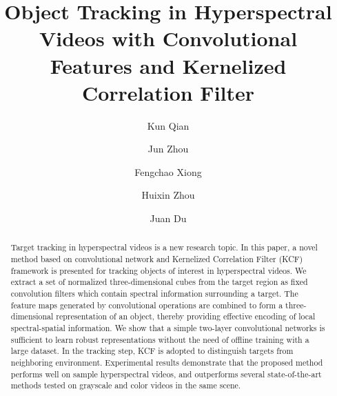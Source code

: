 \documentclass[runningheads,a4paper]{llncs}
\begin{document}
%
\title{Object Tracking in Hyperspectral Videos with Convolutional Features and Kernelized Correlation Filter}
%
%
\author{Kun Qian \and Jun Zhou \and Fengchao Xiong \and Huixin Zhou \and Juan Du}

%
%
%
\maketitle              %
%
\begin{abstract}
Target tracking in hyperspectral videos is a new research topic. In this paper, a novel method based on convolutional network and Kernelized Correlation Filter (KCF) framework is presented for tracking objects of interest in hyperspectral videos. We extract a set of normalized three-dimensional cubes from the target region as fixed convolution filters which contain spectral information surrounding a target. The feature maps generated by convolutional operations are combined to form a three-dimensional representation of an object, thereby providing effective encoding of local spectral-spatial information. We show that a simple two-layer convolutional networks is sufficient to learn robust representations without the need of offline training with a large dataset. In the tracking step, KCF is adopted to distinguish targets from neighboring environment. Experimental results demonstrate that the proposed method performs well on sample hyperspectral videos, and outperforms several state-of-the-art methods tested on grayscale and color videos in the same scene.

\end{abstract}
%
\end{document}

